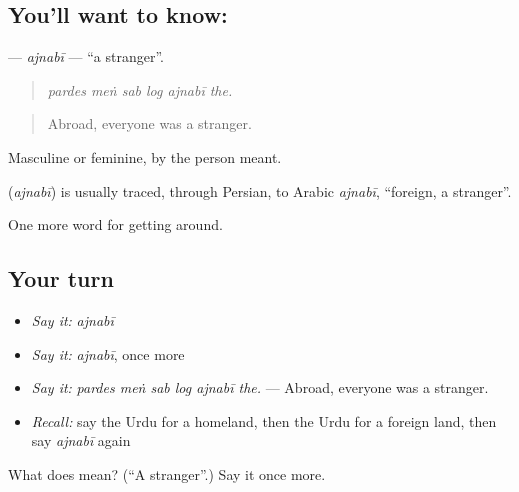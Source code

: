 \subsection*{You'll want to know: }
\textbf{} — \emph{ajnabī} — \textquotedblleft{}a stranger\textquotedblright{}.

\begin{quote}
     
\end{quote}

\begin{quote}
\emph{pardes meṅ sab log ajnabī the.}
\end{quote}

\begin{quote}
Abroad, everyone was a stranger.
\end{quote}

Masculine or feminine, by the person meant.

\begin{cousinweb}
\textbf{} (\emph{ajnabī}) is usually traced, through Persian, to Arabic \emph{ajnabī}, \textquotedblleft{}foreign, a stranger\textquotedblright{}.
\end{cousinweb}

\begin{grammarlens}[title={What you've built}]
One more word for getting around.
\end{grammarlens}

\subsection*{Your turn}
\begin{itemize}
\raggedright
  \item \emph{Say it:} \emph{ajnabī}
  \item \emph{Say it:} \emph{ajnabī}, once more
  \item \emph{Say it:} \emph{pardes meṅ sab log ajnabī the.} — Abroad, everyone was a stranger.
  \item \emph{Recall:} say the Urdu for a homeland, then the Urdu for a foreign land, then say \emph{ajnabī} again
\end{itemize}

\begin{tcolorbox}[breakable,colback=teal!4,colframe=teal!35!black,title={Before you move on}]
What does  mean? (\textquotedblleft{}A stranger\textquotedblright{}.) Say it once more.
\end{tcolorbox}
